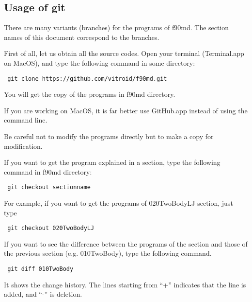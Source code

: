 \subsection{Usage of git}
There are many variants (branches) for the programs of f90md.  The section names of this document correspond to the branches.

First of all, let us obtain all the source codes.  Open your terminal (Terminal.app on MacOS), and type the following command in some directory:
\begin{screen}
\begin{verbatim}
 git clone https://github.com/vitroid/f90md.git
\end{verbatim}
\end{screen}
You will get the copy of the programs in f90md directory.

If you are working on MacOS, it is far better use GitHub.app instead
of using the command line.

\begin{shadebox}
   Be careful not to modify the programs directly but to make  a copy for modification. %
\end{shadebox}

If you want to get the program explained in a section, type the following command in f90md directory:
\begin{screen}
\begin{verbatim}
 git checkout sectionname
\end{verbatim}
\end{screen}

For example, if you want to get the programs of 020TwoBodyLJ section, just type
\begin{screen}
\begin{verbatim}
 git checkout 020TwoBodyLJ
\end{verbatim}
\end{screen}

If you want to see the difference between the programs of the section and those of the previous section (e.g. 010TwoBody), type the following command.
\begin{screen}
\begin{verbatim}
 git diff 010TwoBody
\end{verbatim}
\end{screen}
It shows the change history.  The lines starting from ``+'' indicates that the line is added, and ``-'' is deletion.


